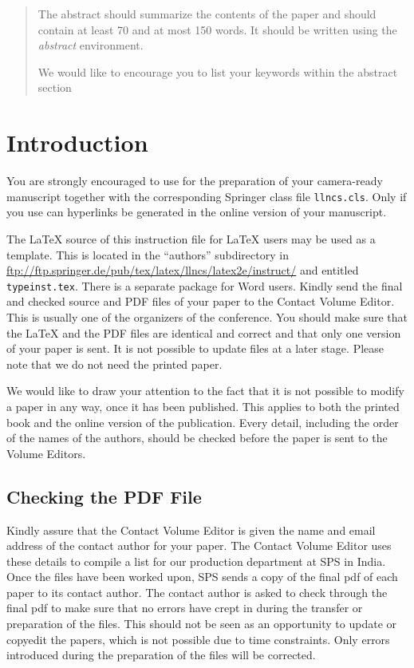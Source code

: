 \documentclass[runningheads,a4paper]{llncs}
\newcommand{\keywords}[1]{\par\addvspace\baselineskip
\noindent\keywordname\enspace\ignorespaces#1}
\begin{document}
\begin{abstract}
The abstract should summarize the contents of the paper and should
contain at least 70 and at most 150 words. It should be written using the
\emph{abstract} environment.
\keywords{We would like to encourage you to list your keywords within
the abstract section}
\end{abstract}


\section{Introduction}

You are strongly encouraged to use \LaTeXe{} for the
preparation of your camera-ready manuscript together with the
corresponding Springer class file \verb+llncs.cls+. Only if you use
\LaTeXe{} can hyperlinks be generated in the online version
of your manuscript.

The \LaTeX{} source of this instruction file for \LaTeX{} users may be
used as a template. This is
located in the ``authors'' subdirectory in
\url{ftp://ftp.springer.de/pub/tex/latex/llncs/latex2e/instruct/} and
entitled \texttt{typeinst.tex}. There is a separate package for Word 
users. Kindly send the final and checked source
and PDF files of your paper to the Contact Volume Editor. This is
usually one of the organizers of the conference. You should make sure
that the \LaTeX{} and the PDF files are identical and correct and that
only one version of your paper is sent. It is not possible to update
files at a later stage. Please note that we do not need the printed
paper.

We would like to draw your attention to the fact that it is not possible
to modify a paper in any way, once it has been published. This applies
to both the printed book and the online version of the publication.
Every detail, including the order of the names of the authors, should
be checked before the paper is sent to the Volume Editors.

\subsection{Checking the PDF File}

Kindly assure that the Contact Volume Editor is given the name and email
address of the contact author for your paper. The Contact Volume Editor
uses these details to compile a list for our production department at
SPS in India. Once the files have been worked upon, SPS sends a copy of
the final pdf of each paper to its contact author. The contact author is
asked to check through the final pdf to make sure that no errors have
crept in during the transfer or preparation of the files. This should
not be seen as an opportunity to update or copyedit the papers, which is
not possible due to time constraints. Only errors introduced during the
preparation of the files will be corrected.
\end{document}
